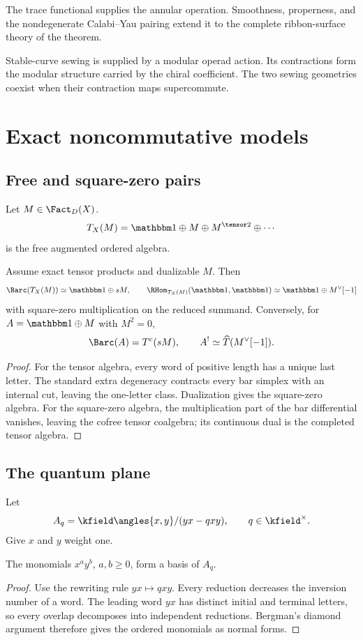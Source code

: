 \begin{remark}
The trace functional supplies the annular operation.  Smoothness, properness, and the nondegenerate Calabi--Yau pairing extend it to the complete ribbon-surface theory of the theorem.
\end{remark}

Stable-curve sewing is supplied by a modular operad action. Its contractions form the modular structure carried by the chiral coefficient. The two sewing geometries coexist when their contraction maps supercommute.

\part{Exact noncommutative models}

\chapter{Free and square-zero pairs}
Let $M\in\Fact_D(X)$.
\[
 T_X(M)=\mathbbm1\oplus M\oplus M^{\tensor2}\oplus\cdots
\]
is the free augmented ordered algebra.

\begin{theorem}
Assume exact tensor products and dualizable $M$. Then
\[
 \Barc(T_X(M))\simeq \mathbbm1\oplus sM,
 \qquad
 \RHom_{T_X(M)}(\mathbbm1,\mathbbm1)
 \simeq \mathbbm1\oplus M^\vee[-1]
\]
with square-zero multiplication on the reduced summand.
Conversely, for $A=\mathbbm1\oplus M$ with $M^2=0$,
\[
 \Barc(A)=T^c(sM),\qquad A^!\simeq \widehat T(M^\vee[-1]).
\]
\end{theorem}
\begin{proof}
For the tensor algebra, every word of positive length has a unique last letter. The standard extra degeneracy contracts every bar simplex with an internal cut, leaving the one-letter class. Dualization gives the square-zero algebra. For the square-zero algebra, the multiplication part of the bar differential vanishes, leaving the cofree tensor coalgebra; its continuous dual is the completed tensor algebra.
\end{proof}

\chapter{The quantum plane}
Let
\[
 A_q=\kfield\angles{x,y}/(yx-qxy),\qquad q\in\kfield^\times.
\]
Give $x$ and $y$ weight one.

\begin{theorem}
The monomials $x^ay^b$, $a,b\ge0$, form a basis of $A_q$.
\end{theorem}
\begin{proof}
Use the rewriting rule $yx\mapsto qxy$. Every reduction decreases the inversion number of a word. The leading word $yx$ has distinct initial and terminal letters, so every overlap decomposes into independent reductions. Bergman's diamond argument therefore gives the ordered monomials as normal forms.
\end{proof}

